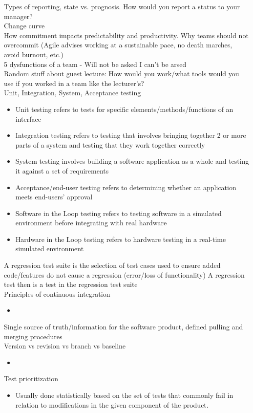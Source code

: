 \documentclass[10pt]{article}
\begin{document}
Types of reporting, state vs. prognosis. How would you report a status to your manager?\\
Change curve\\
How commitment impacts predictability and productivity. Why teams should not overcommit (Agile advises working at a sustainable pace, no death marches, avoid burnout, etc.)\\
5 dysfunctions of a team - Will not be asked I can't be arsed\\
Random stuff about guest lecture: How would you work/what tools would you use if you worked in a team like the lecturer's?\\
Unit, Integration, System, Acceptance testing
\begin{itemize}
\item Unit testing refers to tests for specific elements/methods/functions of an interface
\item Integration testing refers to testing that involves bringing together 2 or more parts of a system and testing that they work together correctly
\item System testing involves building a software application as a whole and testing it against a set of requirements
\item Acceptance/end-user testing refers to determining whether an application meets end-users' approval
\item Software in the Loop testing refers to testing software in a simulated environment before integrating with real hardware
\item Hardware in the Loop testing refers to hardware testing in a real-time simulated environment 
\end{itemize}
A regression test suite is the selection of test cases used to ensure added code/features do not cause a regression (error/loss of functionality)
A regression test then is a test in the regression test suite\\
Principles of continuous integration
\begin{itemize}
\item 
\end{itemize}
Single source of truth/information for the software product, defined pulling and merging procedures\\
Version vs revision vs branch vs baseline
\begin{itemize}
\item 
\end{itemize}
Test prioritization
\begin{itemize}
\item Usually done statistically based on the set of tests that commonly fail in relation to modifications in the given component of the product.
\end{itemize}
\end{document}
